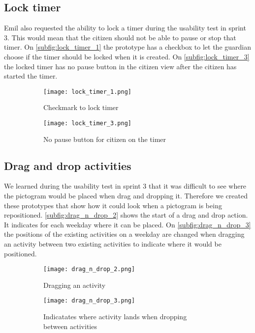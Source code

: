 \subsection{Lock timer}
Emil also requested the ability to lock a timer during the usability test in sprint 3. 
This would mean that the citizen should not be able to pause or stop that timer.
On \autoref{subfig:lock_timer_1} the prototype has a checkbox to let the guardian choose if the timer should be locked when it is created.
On \autoref{subfig:lock_timer_3} the locked timer has no pause button in the citizen view after the citizen has started the timer. 
\begin{figure}[H]
    \begin{subfigure}{0.5\textwidth}
    \texttt{[image: lock\_timer\_1.png]}
    \caption{Checkmark to lock timer}
    \label{subfig:lock_timer_1}
    \end{subfigure}
    \begin{subfigure}{0.5\textwidth}
        \texttt{[image: lock\_timer\_3.png]}
    \caption{No pause button for citizen on the timer}
    \label{subfig:lock_timer_3}
    \end{subfigure} 
    \caption{}
    \label{fig:lock_timer}
\end{figure}

\subsection{Drag and drop activities}
We learned during the usability test in sprint 3 that it was difficult to see where the pictogram would be placed when drag and dropping it.
Therefore we created these prototypes that show how it could look when a pictogram is being repositioned.
\autoref{subfig:drag_n_drop_2} shows the start of a drag and drop action. It indicates for each weekday where it can be placed. 
On \autoref{subfig:drag_n_drop_3} the positions of the existing activities on a weekday are changed when dragging an activity between two existing activities to indicate where it would be positioned.
\begin{figure}[H]
    \begin{subfigure}{0.5\textwidth}
    \texttt{[image: drag\_n\_drop\_2.png]}
    \caption{Dragging an activity}
    \label{subfig:drag_n_drop_2}
    \end{subfigure}
    \begin{subfigure}{0.5\textwidth}
        \texttt{[image: drag\_n\_drop\_3.png]}
    \caption{Indicatates where activity lands when dropping between activities}
    \label{subfig:drag_n_drop_3}
    \end{subfigure} 
    \caption{}
    \label{fig:drag_n_drop}
\end{figure}

